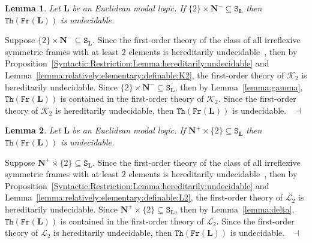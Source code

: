 \documentclass[draft]{article}
\newtheorem{lemma}{Lemma}
\newenvironment{proof}{{\bf Proof:}}{~$\dashv$\\}
\def\Th{\mathtt{Th}}
\def\Fr{\mathtt{Fr}}
\def\L{\mathbf{L}}
\begin{document}
%
%
\begin{lemma}\label{lemma:first:case:2:N:moins}
%
%
Let $\L$ be an Euclidean modal logic.
If $\{2\}{\times}\mathbf{N}^{-}{\subseteq}\mathtt{S}_{\L}$ then $\Th(\Fr(\L))$ is undecidable.
%
%
\end{lemma}
%
%
\begin{proof}
%
%
Suppose $\{2\}{\times}\mathbf{N}^{-}{\subseteq}\mathtt{S}_{\L}$.
Since the first-order theory of the class of all irreflexive symmetric frames with at least $2$ elements is hereditarily undecidable~\cite[Page~$273$]{Ershov:1980}, then by Proposition~\ref{Syntactic:Restriction:Lemma:hereditarily:undecidable} and Lemma~\ref{lemma:relatively:elementary:definable:K2}, the first-order theory of ${\mathcal K}_{2}$ is hereditarily undecidable.
Since $\{2\}{\times}\mathbf{N}^{-}{\subseteq}\mathtt{S}_{\L}$, then by Lemma~\ref{lemma:gamma}, $\Th(\Fr(\L))$ is contained in the first-order theory of ${\mathcal K}_{2}$.
Since the first-order theory of ${\mathcal K}_{2}$ is hereditarily undecidable, then $\Th(\Fr(\L))$ is undecidable.
%
%
\medskip
%
%
\end{proof}
%
%
\begin{lemma}\label{lemma:second:case:N:plus:1}
%
%
Let $\L$ be an Euclidean modal logic.
If $\mathbf{N}^{+}{\times}\{2\}{\subseteq}\mathtt{S}_{\L}$ then $\Th(\Fr(\L))$ is undecidable.
%
%
\end{lemma}
%
%
\begin{proof}
%
%
Suppose $\mathbf{N}^{+}{\times}\{2\}{\subseteq}\mathtt{S}_{\L}$.
Since the first-order theory of the class of all irreflexive symmetric frames with at least $2$ elements is hereditarily undecidable~\cite[Page~$273$]{Ershov:1980}, then by Proposition~\ref{Syntactic:Restriction:Lemma:hereditarily:undecidable} and Lemma~\ref{lemma:relatively:elementary:definable:L2}, the first-order theory of ${\mathcal L}_{2}$ is hereditarily undecidable.
Since $\mathbf{N}^{+}{\times}\{2\}{\subseteq}\mathtt{S}_{\L}$, then by Lemma~\ref{lemma:delta}, $\Th(\Fr(\L))$ is contained in the first-order theory of ${\mathcal L}_{2}$.
Since the first-order theory of ${\mathcal L}_{2}$ is hereditarily undecidable, then $\Th(\Fr(\L))$ is undecidable.
%
%
\medskip
%
%
\end{proof}
%
%
%
%
\end{document}
